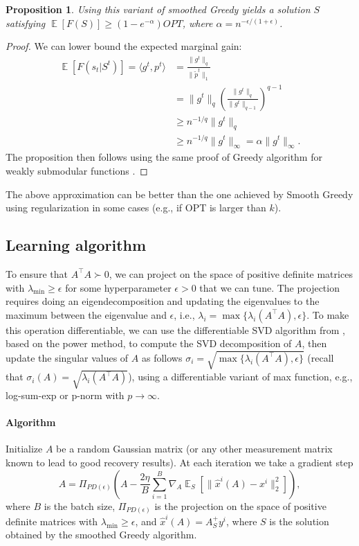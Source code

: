 \documentclass[11pt]{article}
\newtheorem{proposition}{Proposition}
\newcommand{\EE}{\operatorname{\mathbb{E}}}
\begin{document}
\begin{proposition}
Using this variant of smoothed Greedy yields a solution $S$ satisfying $\EE[F(S)] \geq (1- e^{-\alpha}) OPT$, where $\alpha = n^{-\epsilon/(1+\epsilon)}$.
\end{proposition}
\begin{proof}
We can lower bound the expected marginal gain:
\begin{align*}
\EE[F(s_t | S^{t})] =  \langle g^t, p^t \rangle &= \frac{ \|g^t \|_q }{\|\tilde{p}^t\|_1}\\
&= \|g^t \|_q (\frac{ \|g^t \|_q }{\|g^t \|_{q-1}})^{q-1}\\
&\geq n^{-1/q}  \|g^t \|_q \\
&\geq   n^{-1/q}  \|g^t \|_\infty  = \alpha \|g^t \|_\infty. 
\end{align*}
The proposition then follows using the same proof of Greedy algorithm for weakly submodular functions \cite{Bian2017a}. 
\end{proof}

The above approximation can be better than the one achieved by Smooth Greedy using regularization in some cases (e.g., if OPT is larger than $k$).

\subsection{Learning algorithm}
To ensure that $A^\top A \succ 0$, we can project on the space of positive definite matrices with $\lambda_{\min} \geq \epsilon$ for some hyperparameter $\epsilon>0$ that we can tune. The projection requires doing an eigendecomposition and updating the eigenvalues to the maximum between the eigenvalue and $\epsilon$, i.e., $\lambda_i = \max\{\lambda_i(A^\top A), \epsilon\}$. To make this operation differentiable, we can use the differentiable SVD algorithm from  \cite{Indyk2019}, based on the power method, to compute the SVD decomposition of $A$, then update the singular values of $A$ as follows $\sigma_i = \sqrt{\max\{\lambda_i(A^\top A), \epsilon\}}$ (recall that $\sigma_i(A) = \sqrt{\lambda_i(A^\top A)}$), using a differentiable variant of max function, e.g., log-sum-exp or p-norm with $p \to \infty$.

\paragraph{Algorithm}
Initialize $A$ be a random Gaussian matrix (or any other measurement matrix known to lead to good recovery results). At each iteration we take a gradient step 
$$A = \Pi_{PD(\epsilon)}(A -  \frac{2 \eta}{B} \sum_{i=1}^B \nabla_A \EE_{S}[\| \widehat{x}^i(A) - x^i \|_2^2]),$$ where $B$ is the batch size,  $\Pi_{PD(\epsilon)}$ is the projection on the space of positive definite matrices with $\lambda_{\min} \geq \epsilon$, and $\widehat{x}^i(A) = A_S^+ y^i$, where $S$ is the solution obtained by the smoothed Greedy algorithm. 
\end{document}
